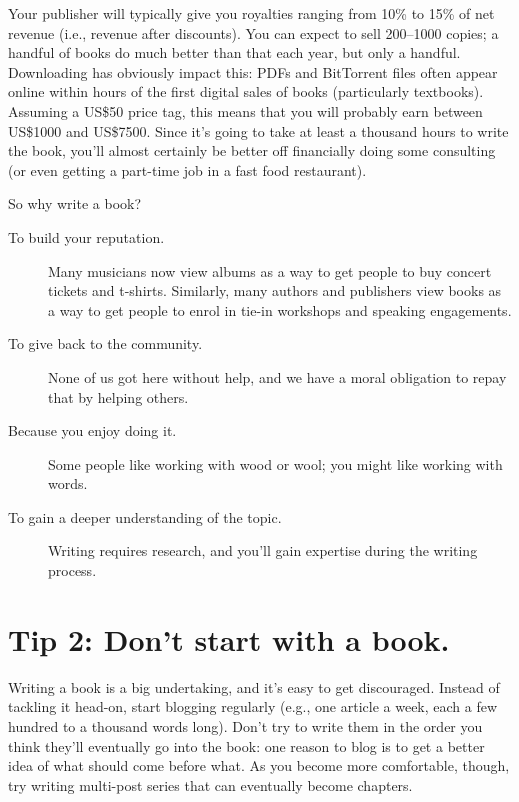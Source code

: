 \documentclass[10pt,letterpaper]{article}
\begin{document}
Your publisher will typically give you royalties ranging from 10\% to 15\% of net revenue
(i.e., revenue after discounts).
You can expect to sell 200–1000 copies;
a handful of books do much better than that each year,
but only a handful.
Downloading has obviously impact this:
PDFs and BitTorrent files often appear online
within hours of the first digital sales of books (particularly textbooks).
Assuming a US\$50 price tag,
this means that you will probably earn between US\$1000 and US\$7500.
Since it's going to take at least a thousand hours to write the book,
you'll almost certainly be better off financially doing some consulting
(or even getting a part-time job in a fast food restaurant).

So why write a book?

\begin{description}

\item[To build your reputation.]
  Many musicians now view albums as a way to get people to buy concert tickets and t-shirts.
  Similarly, many authors and publishers view books as a way to get people
  to enrol in tie-in workshops and speaking engagements.
  
\item[To give back to the community.]
  None of us got here without help,
  and we have a moral obligation to repay that by helping others.
  
\item[Because you enjoy doing it.]
  Some people like working with wood or wool;
  you might like working with words.
  
\item[To gain a deeper understanding of the topic.]
  Writing requires research,
  and you'll gain expertise during the writing process.
  
\end{description}

\section*{Tip 2: Don't start with a book.}

Writing a book is a big undertaking, and it's easy to get discouraged.
Instead of tackling it head-on,
start blogging regularly
(e.g.,
one article a week, each a few hundred to a thousand words long).
Don't try to write them in the order you think they'll eventually go into the book:
one reason to blog is to get a better idea of what should come before what.
As you become more comfortable,
though,
try writing multi-post series that can eventually become chapters.
\end{document}
